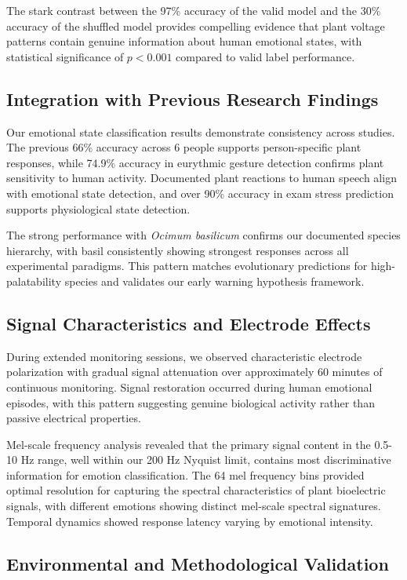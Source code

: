 \documentclass{article}
\begin{document}
The stark contrast between the 97\% accuracy of the valid model and the 30\% accuracy of the shuffled model provides compelling evidence that plant voltage patterns contain genuine information about human emotional states, with statistical significance of $p < 0.001$ compared to valid label performance.

\subsection{Integration with Previous Research Findings}

Our emotional state classification results demonstrate consistency across studies. The previous 66\% accuracy across 6 people supports person-specific plant responses, while 74.9\% accuracy in eurythmic gesture detection confirms plant sensitivity to human activity. Documented plant reactions to human speech align with emotional state detection, and over 90\% accuracy in exam stress prediction supports physiological state detection.

The strong performance with \textit{Ocimum basilicum} confirms our documented species hierarchy, with basil consistently showing strongest responses across all experimental paradigms. This pattern matches evolutionary predictions for high-palatability species and validates our early warning hypothesis framework.

\subsection{Signal Characteristics and Electrode Effects}

During extended monitoring sessions, we observed characteristic electrode polarization with gradual signal attenuation over approximately 60 minutes of continuous monitoring. Signal restoration occurred during human emotional episodes, with this pattern suggesting genuine biological activity rather than passive electrical properties.

Mel-scale frequency analysis revealed that the primary signal content in the 0.5-10 Hz range, well within our 200 Hz Nyquist limit, contains most discriminative information for emotion classification. The 64 mel frequency bins provided optimal resolution for capturing the spectral characteristics of plant bioelectric signals, with different emotions showing distinct mel-scale spectral signatures. Temporal dynamics showed response latency varying by emotional intensity.

\subsection{Environmental and Methodological Validation}
\end{document}
